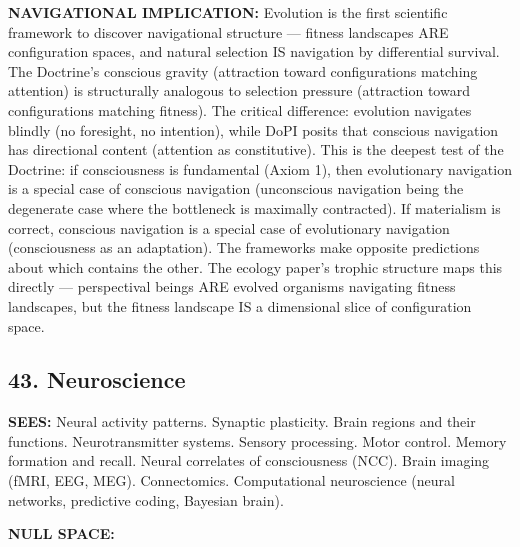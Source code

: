 \textbf{NAVIGATIONAL IMPLICATION:} Evolution is the first scientific framework to discover navigational structure — fitness landscapes ARE configuration spaces, and natural selection IS navigation by differential survival. The Doctrine's conscious gravity (attraction toward configurations matching attention) is structurally analogous to selection pressure (attraction toward configurations matching fitness). The critical difference: evolution navigates blindly (no foresight, no intention), while DoPI posits that conscious navigation has directional content (attention as constitutive). This is the deepest test of the Doctrine: if consciousness is fundamental (Axiom 1), then evolutionary navigation is a special case of conscious navigation (unconscious navigation being the degenerate case where the bottleneck is maximally contracted). If materialism is correct, conscious navigation is a special case of evolutionary navigation (consciousness as an adaptation). The frameworks make opposite predictions about which contains the other. The ecology paper's trophic structure maps this directly — perspectival beings ARE evolved organisms navigating fitness landscapes, but the fitness landscape IS a dimensional slice of configuration space.


\bigskip\noindent\makebox[\textwidth]{\color{rulegray}\rule{5cm}{0.3pt}}\bigskip


\subsection*{43. Neuroscience}


\textbf{SEES:} Neural activity patterns. Synaptic plasticity. Brain regions and their functions. Neurotransmitter systems. Sensory processing. Motor control. Memory formation and recall. Neural correlates of consciousness (NCC). Brain imaging (fMRI, EEG, MEG). Connectomics. Computational neuroscience (neural networks, predictive coding, Bayesian brain).


\textbf{NULL SPACE:}

